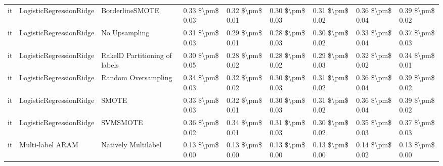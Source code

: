 \begin{tabular}{lllllllll}
      it &         LogisticRegressionRidge &               BorderlineSMOTE &     0.33 \$\textbackslash pm\$ 0.03 &           0.32 \$\textbackslash pm\$ 0.01 &       0.30 \$\textbackslash pm\$ 0.03 &        0.31 \$\textbackslash pm\$ 0.02 &                         0.36 \$\textbackslash pm\$ 0.04 &     0.39 \$\textbackslash pm\$ 0.02 \\
      it &         LogisticRegressionRidge &                 No Upsampling &     0.31 \$\textbackslash pm\$ 0.03 &           0.29 \$\textbackslash pm\$ 0.01 &       0.28 \$\textbackslash pm\$ 0.03 &        0.30 \$\textbackslash pm\$ 0.02 &                         0.33 \$\textbackslash pm\$ 0.04 &     0.37 \$\textbackslash pm\$ 0.03 \\
      it &         LogisticRegressionRidge & RakelD Partitioning of labels &     0.30 \$\textbackslash pm\$ 0.05 &           0.28 \$\textbackslash pm\$ 0.02 &       0.28 \$\textbackslash pm\$ 0.02 &        0.29 \$\textbackslash pm\$ 0.03 &                         0.32 \$\textbackslash pm\$ 0.02 &     0.34 \$\textbackslash pm\$ 0.01 \\
      it &         LogisticRegressionRidge &           Random Oversampling &     0.34 \$\textbackslash pm\$ 0.03 &           0.32 \$\textbackslash pm\$ 0.02 &       0.30 \$\textbackslash pm\$ 0.03 &        0.31 \$\textbackslash pm\$ 0.02 &                         0.36 \$\textbackslash pm\$ 0.04 &     0.39 \$\textbackslash pm\$ 0.02 \\
      it &         LogisticRegressionRidge &                         SMOTE &     0.33 \$\textbackslash pm\$ 0.03 &           0.32 \$\textbackslash pm\$ 0.01 &       0.30 \$\textbackslash pm\$ 0.03 &        0.31 \$\textbackslash pm\$ 0.02 &                         0.36 \$\textbackslash pm\$ 0.04 &     0.39 \$\textbackslash pm\$ 0.02 \\
      it &         LogisticRegressionRidge &                      SVMSMOTE &     0.36 \$\textbackslash pm\$ 0.02 &           0.34 \$\textbackslash pm\$ 0.01 &       0.31 \$\textbackslash pm\$ 0.03 &        0.30 \$\textbackslash pm\$ 0.02 &                         0.35 \$\textbackslash pm\$ 0.03 &     0.37 \$\textbackslash pm\$ 0.03 \\
      it &                Multi-label ARAM &           Natively Multilabel &     0.13 \$\textbackslash pm\$ 0.00 &           0.13 \$\textbackslash pm\$ 0.00 &       0.13 \$\textbackslash pm\$ 0.00 &        0.13 \$\textbackslash pm\$ 0.00 &                         0.14 \$\textbackslash pm\$ 0.02 &     0.13 \$\textbackslash pm\$ 0.00 \\

\end{tabular}

